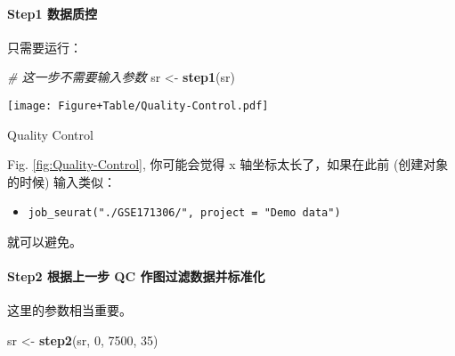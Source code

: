 \documentclass[
]{article}
\newenvironment{Shaded}{\begin{snugshade}}{\end{snugshade}}
\newcommand{\CommentTok}[1]{\textcolor[rgb]{0.56,0.35,0.01}{\textit{#1}}}
\newcommand{\DecValTok}[1]{\textcolor[rgb]{0.00,0.00,0.81}{#1}}
\newcommand{\KeywordTok}[1]{\textcolor[rgb]{0.13,0.29,0.53}{\textbf{#1}}}
\newcommand{\NormalTok}[1]{#1}
\newcommand{\OperatorTok}[1]{\textcolor[rgb]{0.81,0.36,0.00}{\textbf{#1}}}
\newcommand{\StringTok}[1]{\textcolor[rgb]{0.31,0.60,0.02}{#1}}
\providecommand{\tightlist}{%
  \setlength{\itemsep}{0pt}\setlength{\parskip}{0pt}}
\begin{document}
\hypertarget{step1-ux6570ux636eux8d28ux63a7}{%
\paragraph{Step1 数据质控}\label{step1-ux6570ux636eux8d28ux63a7}}

只需要运行：

\begin{Shaded}
\begin{Highlighting}[]
\CommentTok{\# 这一步不需要输入参数}
\NormalTok{sr \textless{}{-}}\StringTok{ }\KeywordTok{step1}\NormalTok{(sr)}
\end{Highlighting}
\end{Shaded}

\begin{Shaded}
\end{Shaded}

\def\@captype{figure}
\begin{center}
\texttt{[image: Figure+Table/Quality-Control.pdf]}
\caption{Quality Control}\label{fig:Quality-Control}
\end{center}

Fig. \ref{fig:Quality-Control}, 你可能会觉得 x 轴坐标太长了，如果在此前
(创建对象的时候) 输入类似：

\begin{itemize}
\tightlist
\item
  \texttt{job\_seurat("./GSE171306/",\ project\ =\ "Demo\ data")}
\end{itemize}

就可以避免。

\hypertarget{step2-ux6839ux636eux4e0aux4e00ux6b65-qc-ux4f5cux56feux8fc7ux6ee4ux6570ux636eux5e76ux6807ux51c6ux5316}{%
\paragraph{Step2 根据上一步 QC 作图过滤数据并标准化}\label{step2-ux6839ux636eux4e0aux4e00ux6b65-qc-ux4f5cux56feux8fc7ux6ee4ux6570ux636eux5e76ux6807ux51c6ux5316}}

这里的参数相当重要。

\begin{Shaded}
\begin{Highlighting}[]
\NormalTok{sr \textless{}{-}}\StringTok{ }\KeywordTok{step2}\NormalTok{(sr, }\DecValTok{0}\NormalTok{, }\DecValTok{7500}\NormalTok{, }\DecValTok{35}\NormalTok{)}
\end{Highlighting}
\end{Shaded}
\end{document}
